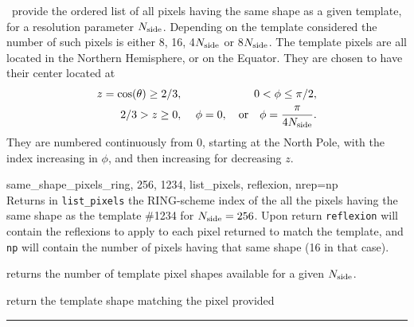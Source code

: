 \begin{codedescription}
{\thedocid\ provide the ordered list of all \healpix pixels having the same shape
  as a given template, for a resolution parameter $N_{\rm side}$. Depending on the
  template considered the number of such pixels is either 8, 16, 4$N_{\rm side}$ or
  8$N_{\rm side}$. The template pixels are all located in the Northern Hemisphere, or on the
 Equator.
They are chosen to have their center located at
\begin{eqnarray}
	\label{eq:same_shape_pixels_xxx_idl}
     z=\cos(\theta)\ge 2/3,  &\ &    0< \phi \leq \pi/2,   \nonumber\\            %
     2/3 > z \geq 0,  &\ & \phi=0, \quad{\rm or}\quad  \phi=\frac{\pi}{4\nside}. %
\myhtmlimage{}
\end{eqnarray}
 They are numbered continuously from 0, starting at the North Pole, with the index
 increasing in $\phi$, and then increasing for decreasing $z$.
}
\end{codedescription}


\begin{example}
{
same\_shape\_pixels\_ring, 256, 1234, list\_pixels, reflexion, nrep=np  \\
}
{
Returns in {\tt list\_pixels} the RING-scheme index of the all the pixels having
the same shape as the template \#1234 for $N_{\rm side}=256$. Upon return {\tt reflexion} will
contain the reflexions to apply to each pixel returned to match the template,
and {\tt np} will contain the number of pixels having that same shape (16 in that case).
}
\end{example}
\begin{related}
  \begin{sulist}{} %
  \item[\htmlref{nside2templates}{idl:nside2ntemplates}] returns the
  number of template pixel shapes available for a given $N_{\rm side}$.
  \item[\htmlref{template\_pixel\_ring}{idl:template_pixel_xxx}] 
  \item[\htmlref{template\_pixel\_nest}{idl:template_pixel_xxx}] 
  return
  the template shape matching the pixel provided
  \end{sulist}
\end{related}

\rule{\hsize}{2mm}

